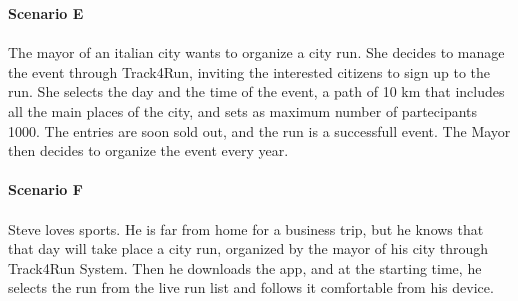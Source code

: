 \textbf{Scenario E} \\ \\ 
The mayor of an italian city wants to organize a city run. She decides to manage the event through Track4Run, inviting the interested citizens to sign up to the run. She selects the day and the time of the event, a path of 10 km that includes all the main places of the city, and sets as maximum number of partecipants 1000. The entries are soon sold out, and the run is a successfull event. The Mayor then decides to organize the event every year. \\ \\
\textbf{Scenario F} \\ \\
Steve loves sports. He is far from home for a business trip, but he knows that that day  will take place a city run, organized by the mayor of his city through Track4Run System. Then he downloads the app, and at the starting time, he selects the run from the live run list and follows it comfortable from his device. 




